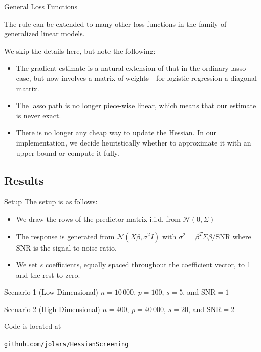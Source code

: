 \documentclass[10pt,ignorenonframetext]{beamer}
\begin{document}
\begin{frame}{General Loss Functions}

  The rule can be extended to many other loss functions in the family of
  generalized linear models.

  \medskip

  We skip the details here, but note the following:
  \begin{itemize}
    \item The gradient estimate is a natural extension of that in the ordinary
          lasso case, but now involves a matrix of weights---for logistic
          regression a diagonal matrix.
    \item The lasso path is no longer piece-wise linear, which means that our
          estimate is never exact.
    \item There is no longer any cheap way to update the Hessian. In our
          implementation, we decide heuristically whether to approximate it
          with an
          upper bound or compute it fully.
  \end{itemize}
\end{frame}

\subsection{Results}

\begin{frame}{Setup}
  The setup is as follows:
  \begin{itemize}
    \item We draw the rows of the predictor matrix i.i.d. from
          \(\mathcal{N}(0,\Sigma)\)
    \item The response is generated from \(\mathcal{N}(X\beta,\sigma^2 I)\)
          with
          \(\sigma^2 = \beta^T\Sigma \beta/\text{SNR}\) where SNR is the
          signal-to-noise ratio.
    \item We set \(s\) coefficients, equally spaced throughout the coefficient
          vector, to 1 and the rest to zero.
  \end{itemize}

  \begin{block}{Scenario 1 (Low-Dimensional)}
    \(n = 10\,000\), \(p = 100\), \(s = 5\), and \(\text{SNR} = 1\)
  \end{block}

  \begin{block}{Scenario 2 (High-Dimensional)}
    \(n = 400\), \(p = 40\,000\), \(s = 20\), and \(\text{SNR} = 2\)
  \end{block}

  \medskip

  Code is located at

  \href{https://github.com/jolars/HessianScreening}{\nolinkurl{github.com/jolars/HessianScreening}}
\end{frame}
\end{document}
